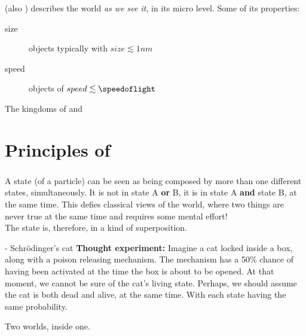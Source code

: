 \documentclass[aspectratio=43]{beamer}
\begin{document}
\begin{frame}{\qp}
\begin{card}
    \qp (also \qm) describes the world \textit{as we see it}, in its micro level. Some of its properties:
    \begin{description}
        \item[size] objects typically with $size \lesssim 1nm$
        \item[speed] objects of $speed \lesssim \speedoflight$
    \end{description}
\end{card}
\pagenumber
\end{frame}

\begin{frame}{The kingdoms of \cl and \qm}
\begin{card}
    \centering{}
\end{card}
\pagenumber
\end{frame}

\section{Principles of \qm}
\subsubsection{\qsp}
\begin{frame}{\qsp}
    \begin{card}
        A \q state (of a particle) can be seen as being composed by more than one different states, simultaneously. It is not in state A \textbf{or} B, it is in state A \textbf{and} state B, at the same time. This defies classical views of the world, where two things are never true at the same time and requires some mental effort!\\
        The state is, therefore, in a kind of superposition.
    \end{card}
\pagenumber
\end{frame}

\begin{frame}{\qsp - Schrödinger's cat}
    \textbf{Thought experiment:} Imagine a cat locked inside a box, along with a poison releasing mechanism. The mechanism has a 50\% chance of having been activated at the time the box is about to be opened. At that moment, we cannot be sure of the cat's living state. Perhaps, we should assume the cat is both dead and alive, at the same time. With each state having the same probability.
    \begin{center}
    \end{center}
    \begin{center}
        Two worlds, inside one.
    \end{center}
\pagenumber
\end{frame}
\end{document}
